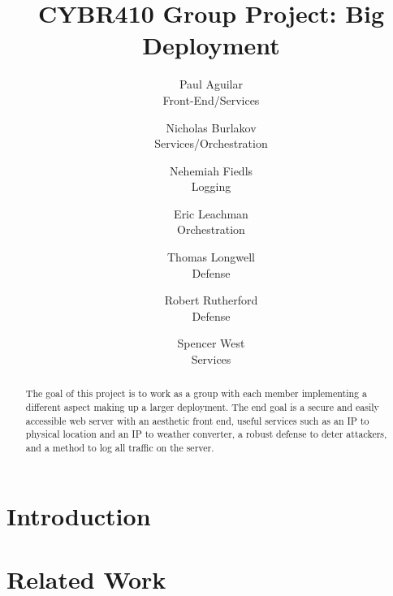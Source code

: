 \documentclass[letterpaper,twocolumn,10pt]{article}
\begin{document}

\date{}

\title{\Large \bf CYBR410 Group Project: Big Deployment}

\author{
  {\rm Paul Aguilar}\\
  Front-End/Services
  \and
  {\rm Nicholas Burlakov}\\
  Services/Orchestration
  \and
  {\rm Nehemiah Fiedls}\\
  Logging
  \and
  {\rm Eric Leachman}\\
  Orchestration
  \and
  {\rm Thomas Longwell}\\
  Defense
  \and
  {\rm Robert Rutherford}\\
  Defense
  \and
  {\rm Spencer West}\\
  Services
  \and
}

\maketitle

\begin{abstract}
The goal of this project is to work as a group with each member implementing a different aspect making up a larger deployment. The end goal is a secure and easily accessible web server with an aesthetic front end, useful services such as an IP to physical location and an IP to weather converter, a robust defense to deter attackers,  and a method to log all traffic on the server. 
\end{abstract}


\section{Introduction} \label{Introduction}


\section{Related Work} \label{Related Work}

\end{document}
